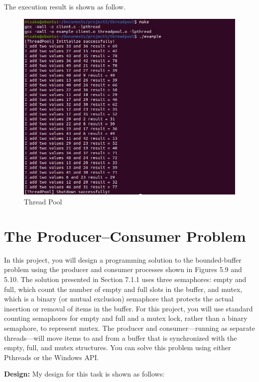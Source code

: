 \documentclass[UTF8,10pt,a4paper]{article}
\theoremstyle{Problem}
\theoremstyle{Solution}
\begin{document}
The execution result is shown as follow.
\begin{figure}[H]
    \centering
    \includegraphics[width=400pt]{1.png}
    \caption{Thread Pool}
    \label{3}
\end{figure}


\section{The Producer–Consumer Problem}

In this project, you will design a programming solution to the bounded-buffer problem using the producer and consumer processes shown in Figures 5.9 and 5.10. The solution presented in Section 7.1.1 uses three semaphores: empty and full, which count the number of empty and full slots in the buffer, and mutex, which is a binary (or mutual exclusion) semaphore that protects the actual insertion or removal of items in the buffer. For this project, you will use standard counting semaphores for empty and full and a mutex lock, rather than a binary semaphore, to represent mutex. The producer and consumer—running as separate threads—will move items to and from a buffer that is synchronized with the empty, full, and mutex structures. You can solve this problem using either Pthreads or the Windows API.



\textbf{Design:} My design for this task is shown as follows:
\end{document}
